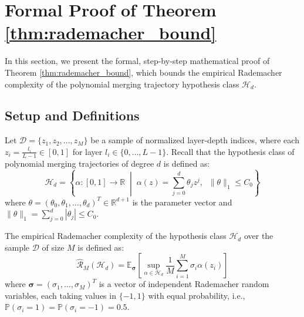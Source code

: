\documentclass{article}
\theoremstyle{plain}
\theoremstyle{definition}
\theoremstyle{remark}
\begin{document}










\newpage
\appendix
\onecolumn
\section{Formal Proof of Theorem \ref{thm:rademacher_bound}}
\label{sec:appendix_proof}

In this section, we present the formal, step-by-step mathematical proof of Theorem \ref{thm:rademacher_bound}, which bounds the empirical Rademacher complexity of the polynomial merging trajectory hypothesis class $\mathcal{H}_d$.

\subsection{Setup and Definitions}
Let $\mathcal{D} = \{z_1, z_2, \dots, z_M\}$ be a sample of normalized layer-depth indices, where each $z_i = \frac{l_i}{L-1} \in [0, 1]$ for layer $l_i \in \{0, \dots, L-1\}$.
Recall that the hypothesis class of polynomial merging trajectories of degree $d$ is defined as:
\begin{equation}
\mathcal{H}_d = \left\{ \alpha: [0, 1] \to \mathbb{R} \;\middle|\; \alpha(z) = \sum_{j=0}^d \theta_j z^j, \;\; \|\theta\|_1 \le C_0 \right\}
\end{equation}
where $\theta = (\theta_0, \theta_1, \dots, \theta_d)^T \in \mathbb{R}^{d+1}$ is the parameter vector and $\|\theta\|_1 = \sum_{j=0}^d |\theta_j| \le C_0$.

The empirical Rademacher complexity of the hypothesis class $\mathcal{H}_d$ over the sample $\mathcal{D}$ of size $M$ is defined as:
\begin{equation}
\widehat{\mathcal{R}}_M(\mathcal{H}_d) = \mathbb{E}_{\boldsymbol{\sigma}} \left[ \sup_{\alpha \in \mathcal{H}_d} \frac{1}{M} \sum_{i=1}^M \sigma_i \alpha(z_i) \right]
\end{equation}
where $\boldsymbol{\sigma} = (\sigma_1, \dots, \sigma_M)^T$ is a vector of independent Rademacher random variables, each taking values in $\{-1, 1\}$ with equal probability, i.e., $\mathbb{P}(\sigma_i = 1) = \mathbb{P}(\sigma_i = -1) = 0.5$.
\end{document}
